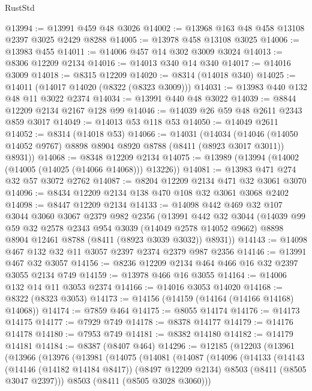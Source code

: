 \begin{lexlean}{RustStd}
\begin{coremodule}
@13994 := @13991 @459 @48 @3026
@14002 := @13968 @163 @48 @458 @13108 @2397 @3025 @2429 @8288
@14005 := @13978 @458 @13108 @3025
@14006 := @13983 @455
@14011 := @14006 @457 @14 @302 @3009 @3024
@14013 := @8306 @12209 @2134
@14016 := @14013 @340 @14 @340
@14017 := @14016 @3009
@14018 := @8315 @12209
@14020 := @8314 (@14018 @340)
@14025 := @14011 (@14017 @14020 (@8322 (@8323 @3009)))
@14031 := @13983 @440 @132 @48 @11 @3022 @2374
@14034 := @13991 @440 @48 @3022
@14039 := @8844 @12209 @2134 @2167 @128 @99
@14046 := @14039 @26 @59 @48 @2611 @2343 @859 @3017
@14049 := @14013 @53 @118 @53
@14050 := @14049 @2611
@14052 := @8314 (@14018 @53)
@14066 := @14031
    (@14034
      (@14046 (@14050 @14052 @9767) @8898 @8904 @8920 @8788 (@8411 (@8923 @3017 @3011)) @8931))
@14068 := @8348 @12209 @2134
@14075 := @13989 (@13994 (@14002 (@14005 (@14025 (@14066 @14068))) @13226))
@14081 := @13983 @471 @274 @32 @57 @3072 @2762
@14087 := @8204 @12209 @2134 @471 @32 @3061 @3070
@14096 := @8434 @12209 @2134 @138 @470 @108 @32 @3061 @3068 @2402
@14098 := @8447 @12209 @2134
@14133 := @14098
    @442
    @469
    @32
    @107
    @3044
    @3060
    @3067
    @2379
    @982
    @2356
    (@13991
      @442
      @32
      @3044
      (@14039
        @99
        @59
        @32
        @2578
        @2343
        @954
        @3039
        (@14049 @2578 @14052 @9662)
        @8898
        @8904
        @12461
        @8788
        (@8411 (@8923 @3039 @3032))
        @8931))
@14143 := @14098 @467 @132 @32 @11 @3057 @2397 @2374 @2379 @987 @2356
@14146 := @13991 @467 @32 @3057
@14156 := @8236 @12209 @2134 @464 @466 @16 @32 @2397 @3055 @2134 @749
@14159 := @13978 @466 @16 @3055
@14164 := @14006 @132 @14 @11 @3053 @2374
@14166 := @14016 @3053 @14020
@14168 := @8322 (@8323 @3053)
@14173 := @14156 (@14159 (@14164 (@14166 @14168) @14068))
@14174 := @7859 @464
@14175 := @8055 @14174
@14176 := @14173 @14175
@14177 := @7929 @749
@14178 := @8378 @14177
@14179 := @14176 @14178
@14180 := @7953 @749
@14181 := @8382 @14180
@14182 := @14179 @14181
@14184 := @8387 (@8407 @464)
@14296 := @12185
    (@12203
      (@13961
        (@13966
          (@13976
            (@13981
              (@14075
                (@14081
                  (@14087
                    (@14096
                      (@14133
                        (@14143
                          (@14146 (@14182 @14184 @8417))
                          (@8497 @12209 @2134)
                          @8503
                          (@8411 (@8505 @3047 @2397)))
                        @8503
                        (@8411 (@8505 @3028 @3060)))

\end{coremodule}
\end{lexlean}
